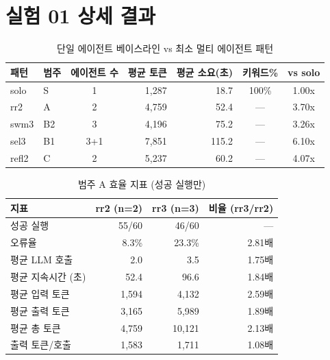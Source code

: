 \documentclass[a4paper,11pt]{article}
\begin{document}
\renewcommand{\refname}{참고 문헌}



\appendix


\section{실험 01 상세 결과}
\label{app:exp01-details}

\begin{table}[H]
\centering
\caption{단일 에이전트 베이스라인 vs 최소 멀티 에이전트 패턴}
\label{tab:solo-baseline}
{\small
\begin{tabular}{llcrrcc}
\toprule
패턴 & 범주 & 에이전트 수 & 평균 토큰 & 평균 소요(초) & 키워드\% & vs solo \\
\midrule
solo & S & 1 & 1,287 & 18.7 & 100\% & 1.00x \\
rr2  & A & 2 & 4,759 & 52.4 & --- & 3.70x \\
swm3 & B2 & 3 & 4,196 & 75.2 & --- & 3.26x \\
sel3 & B1 & 3+1 & 7,851 & 115.2 & --- & 6.10x \\
refl2 & C & 2 & 5,237 & 60.2 & --- & 4.07x \\
\bottomrule
\end{tabular}
}
\end{table}

\begin{table}[H]
\centering
\caption{범주 A 효율 지표 (성공 실행만)}
\label{tab:cat-a-efficiency}
{\small
\begin{tabular}{lrrr}
\toprule
지표 & rr2 (n=2) & rr3 (n=3) & 비율 (rr3/rr2) \\
\midrule
성공 실행      & 55/60 & 46/60 & --- \\
오류율          & 8.3\% & 23.3\% & 2.81배 \\
평균 LLM 호출  & 2.0 & 3.5 & 1.75배 \\
평균 지속시간 (초) & 52.4 & 96.6 & 1.84배 \\
평균 입력 토큰  & 1,594 & 4,132 & 2.59배 \\
평균 출력 토큰  & 3,165 & 5,989 & 1.89배 \\
평균 총 토큰    & 4,759 & 10,121 & 2.13배 \\
출력 토큰/호출  & 1,583 & 1,711 & 1.08배 \\
\bottomrule
\end{tabular}
}
\end{table}
\end{document}
